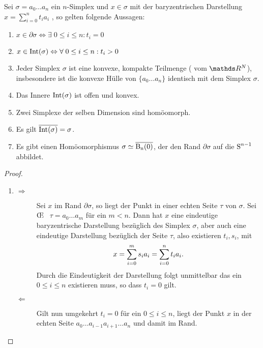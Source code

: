 \begin{Satz}\label{satz:simp}
  \normalfont Sei $\sigma = a_0 \ldots a_n $ ein $n$-Simplex und
  $x \in \sigma$ mit der baryzentrischen Darstellung
  $x=\sum\limits_{i=0}^n t_i a_i$ , so gelten folgende Aussagen:
  \begin{enumerate}[$(a)$]
  \item
    $x \in \partial\sigma \Leftrightarrow \exists \; 0 \leq i \leq n :
    t_i = 0$
  \item \label{satz:a}
    $x \in \Int(\sigma) \Leftrightarrow \forall \; 0 \leq i \leq n :
    t_i > 0$
  \item Jeder Simplex $\sigma$ ist eine konvexe, kompakte Teilmenge (
    vom $\R^N$), insbesondere ist die konvexe Hülle von
    $\{ a_0 \ldots a_n \}$ identisch mit dem Simplex $\sigma$.
  \item Das Innere $\Int(\sigma)$ ist offen und konvex.
  \item Zwei Simplexe der selben Dimension sind homöomorph.
  \item Es gilt $\overline{\Int(\sigma)} = \sigma$.
  \item Es gibt einen Homöomorphismus $\sigma \simeq \Bn$, der den
    Rand $\partial\sigma$ auf die $\Sp^{n-1}$ abbildet.
  \end{enumerate}
  \begin{proof}
    \begin{enumerate}[$a)$:]
    \item
      \begin{description}
      \item[\glqq $\Rightarrow$\grqq] Sei $x$ im Rand
        $\partial\sigma$, so liegt der Punkt in einer echten Seite
        $\tau$ von $\sigma$. Sei \OE~ $\tau = a_0 \ldots a_m$ für ein
        $m < n$. Dann hat $x$ eine eindeutige baryzentrische
        Darstellung bezüglich des Simplex $\sigma$, aber auch eine
        eindeutige Darstellung bezüglich der Seite $\tau$, also
        existieren $t_i,s_i$, mit
        \begin{gather*}
          x = \sp{0}{m} s_i a_i = \sp{0}{n} t_i a_i .
        \end{gather*}
        Durch die Eindeutigkeit der Darstellung folgt unmittelbar das
        ein $0 \leq i \leq n$ existieren muss, so dass $t_i = 0$ gilt.
      \item[\glqq $\Leftarrow$ \grqq] Gilt nun umgekehrt $t_i = 0$ für
        ein $0 \leq i \leq n$, liegt der Punkt $x$ in der echten Seite
        $a_0 \ldots a_{i-1} a_{i+1} \ldots a_n$ und damit im Rand.
      \end{description}


\end{enumerate}
\end{proof}
\end{Satz}

